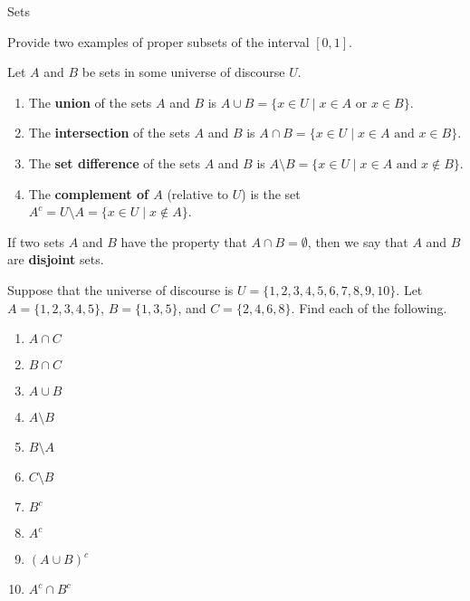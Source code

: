 \begin{section}{Sets}
\begin{exercise}
Provide two examples of proper subsets of the interval $[0,1]$.
\end{exercise}

\begin{definition}
Let $A$ and $B$ be sets in some universe of discourse $U$.
\begin{enumerate}[label=\textrm{(\alph*)}]
\item The \textbf{union} of the sets $A$ and $B$ is $\boxed{A \cup B} =\{x\in U \mid x\in A \mbox{ or } x\in B \}$.
\item The \textbf{intersection} of the sets $A$ and $B$ is $\boxed{A \cap B} =\{x\in U \mid x\in A \mbox{ and } x\in B \}$.
\item The \textbf{set difference} of the sets $A$ and $B$ is $\boxed{A \setminus B} =\{x\in U \mid x\in A \mbox{ and } x\notin B \}$.
\item The \textbf{complement of $A$} (relative to $U$) is the set $\boxed{A^c}=U \setminus A =\{x \in U \mid x \notin A\}$.
\end{enumerate}
\end{definition}

\begin{definition}
If two sets $A$ and $B$ have the property that $A \cap B = \emptyset$, then we say that $A$ and $B$ are \textbf{disjoint} sets.
\end{definition}

\begin{exercise}
Suppose that the universe of discourse is $U=\{1,2,3,4,5,6,7,8,9,10\}$.  Let $A=\{1, 2, 3, 4, 5\}$, $B=\{1, 3, 5\}$, and $C=\{2, 4, 6, 8\}$.  Find each of the following.

\begin{multicols}{2}
\begin{enumerate}[label=\textrm{(\alph*)}]
\item $A \cap C$
\item $B \cap C$
\item $A \cup B$
\item $A\setminus B$
\item $B \setminus A$
\item $C \setminus B$
\item $B^c$
\item $A^c$
\item $(A\cup B)^c$
\item $A^c\cap B^c$
\end{enumerate}
\end{multicols}
\end{exercise}


\end{section}
